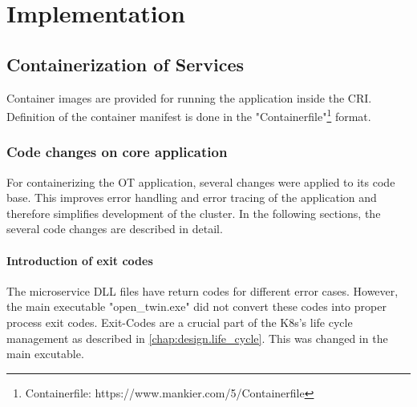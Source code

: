 \chapter{Implementation} %

\label{chap:implementation} %



\section{Containerization of Services}
Container images are provided for running the application inside the \ac{CRI}. Definition of the container manifest is done in the "Containerfile"\footnote{Containerfile: https://www.mankier.com/5/Containerfile} format.


\subsection{Code changes on core application}
For containerizing the \ac{OT} application, several changes were applied to its code base. This improves error handling and error tracing of the application and therefore simplifies development of the cluster. In the following sections, the several code changes are described in detail.

\subsubsection*{Introduction of exit codes}
The microservice \ac{DLL} files have return codes for different error cases. However, the main executable "open\_twin.exe" did not convert these codes into proper process exit codes. 
Exit-Codes are a crucial part of the \ac{K8s}'s life cycle management as described in \autoref{chap:design.life_cycle}.
 This was changed in the main excutable.
 
